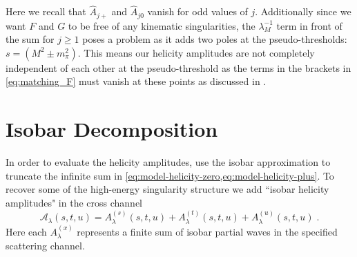 \documentclass[10pt, aps,prd,amsmath,amssymb,superscriptaddress,onecolumn,
nofootinbib,showpacs,preprintnumbers]{revtex4-1}
\begin{document}
 Here we recall that \(\hat{A}_{j+}\) and \(\hat{A}_{j0}\) vanish for odd values of \(j\). Additionally since we want \(F\) and \(G\) to be free of any kinematic singularities, the \(\lambda_M^{-1}\) term in front of the sum for \(j\geq 1\) poses a problem as it adds two poles at the pseudo-thresholds: \(s = (M^2 \pm m_\pi^2)\).
 This means our helicity amplitudes are not completely independent of each other at the pseudo-threshold as the terms in the brackets in \cref{eq:matching_F} must vanish at these points as discussed in \cite{Mikhasenko:2017rkh}.
\section{Isobar Decomposition} \label{sec:isobar-decomp}
In order to evaluate the helicity amplitudes, use the isobar approximation to truncate the infinite sum in \cref{eq:model-helicity-zero,eq:model-helicity-plus}. To recover some of the high-energy singularity structure we add ``isobar helicity amplitudes" in the cross channel
  \begin{equation}
    \label{eq:isobar-def}
    \mathcal{A}_\lambda(s,t,u) = A_\lambda^{(s)}(s,t,u) +  A_\lambda^{(t)}(s,t,u) + A_\lambda^{(u)}(s,t,u) \; .
  \end{equation}
Here each \(A_\lambda^{(x)}\) represents a finite sum of isobar partial waves in the specified scattering channel.
\end{document}
